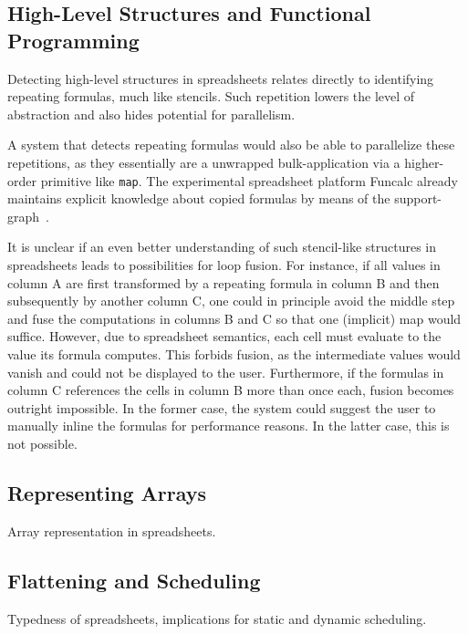 \documentclass[a4paper]{article}
\begin{document}
\subsection{High-Level Structures and Functional Programming}
\label{sec:high-level-struct}

Detecting high-level structures in spreadsheets relates directly to
identifying repeating formulas, much like stencils. Such repetition
lowers the level of abstraction and also hides potential for
parallelism.

A system that detects repeating formulas would also be able to
parallelize these repetitions, as they essentially are a unwrapped
bulk-application via a higher-order primitive like \texttt{map}. The
experimental spreadsheet platform Funcalc already maintains explicit
knowledge about copied formulas by means of the
support-graph~\cite{Sestoft2014Spreadsheet}.

It is unclear if an even better understanding of such stencil-like
structures in spreadsheets leads to possibilities for loop fusion. For
instance, if all values in column A are first transformed by a
repeating formula in column B and then subsequently by another column
C, one could in principle avoid the middle step and fuse the
computations in columns B and C so that one (implicit) map would
suffice. However, due to spreadsheet semantics, each cell must
evaluate to the value its formula computes. This forbids fusion, as
the intermediate values would vanish and could not be displayed to the
user. Furthermore, if the formulas in column C references the cells in
column B more than once each, fusion becomes outright impossible. In
the former case, the system could suggest the user to manually inline
the formulas for performance reasons. In the latter case, this is not
possible.

\subsection{Representing Arrays}
\label{sec:representing-arrays}

Array representation in spreadsheets. 

\subsection{Flattening and Scheduling}
\label{sec:scheduling}

Typedness of spreadsheets, implications for static and dynamic
scheduling. 
\end{document}
